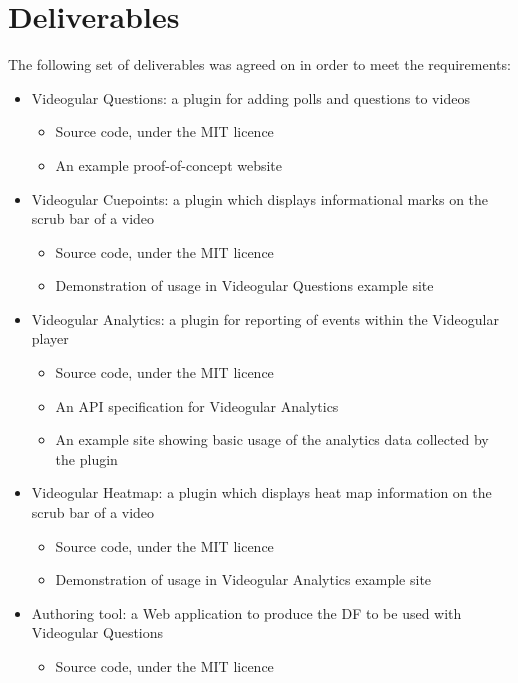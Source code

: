 \newpage %
\section{Deliverables}
\label{Section:Deliverables}

The following set of deliverables was agreed on in order to meet the requirements:

\begin{itemize}
	\item Videogular Questions: a plugin for adding polls and questions to videos
		\begin{itemize}
			\item Source code, under the MIT licence
			\item An example proof-of-concept website
		\end{itemize}
	\item Videogular Cuepoints: a plugin which displays informational marks on the \gls{scrub bar} of a video
		\begin{itemize}
			\item Source code, under the MIT licence
			\item Demonstration of usage in Videogular Questions example site
		\end{itemize}
	\item Videogular Analytics: a plugin for reporting of events within the Videogular player
		\begin{itemize}
			\item Source code, under the MIT licence
			\item An API specification for Videogular Analytics
			\item An example site showing basic usage of the analytics data collected by the plugin
		\end{itemize}
	\item Videogular Heatmap: a plugin which displays heat map information on the \gls{scrub bar} of a video
		\begin{itemize}
			\item Source code, under the MIT licence
			\item Demonstration of usage in Videogular Analytics example site
		\end{itemize}
	\item Authoring tool: a Web application to produce the \gls{DF} to be used with Videogular Questions
		\begin{itemize}
			\item Source code, under the MIT licence
		\end{itemize}
\end{itemize}


